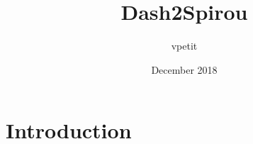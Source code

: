\documentclass{article}
\title{Dash2Spirou}
\author{vpetit }
\date{December 2018}
\begin{document}
\maketitle

\section{Introduction}
\end{document}
